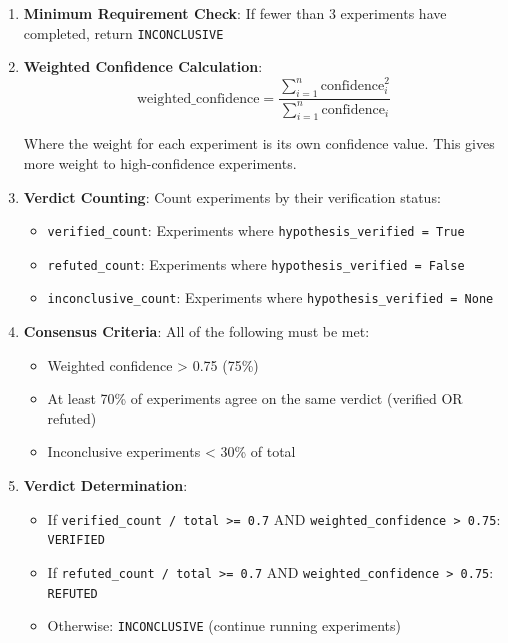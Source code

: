 \documentclass{book}
\begin{document}
\begin{enumerate}
    \item \textbf{Minimum Requirement Check}: If fewer than 3 experiments have completed, return \texttt{INCONCLUSIVE}

    \item \textbf{Weighted Confidence Calculation}:
    \begin{equation}
        \text{weighted\_confidence} = \frac{\sum_{i=1}^{n} \text{confidence}_i^2}{\sum_{i=1}^{n} \text{confidence}_i}
    \end{equation}

    Where the weight for each experiment is its own confidence value. This gives more weight to high-confidence experiments.

    \item \textbf{Verdict Counting}: Count experiments by their verification status:
    \begin{itemize}
        \item \texttt{verified\_count}: Experiments where \texttt{hypothesis\_verified = True}
        \item \texttt{refuted\_count}: Experiments where \texttt{hypothesis\_verified = False}
        \item \texttt{inconclusive\_count}: Experiments where \texttt{hypothesis\_verified = None}
    \end{itemize}

    \item \textbf{Consensus Criteria}: All of the following must be met:
    \begin{itemize}
        \item Weighted confidence > 0.75 (75\%)
        \item At least 70\% of experiments agree on the same verdict (verified OR refuted)
        \item Inconclusive experiments < 30\% of total
    \end{itemize}

    \item \textbf{Verdict Determination}:
    \begin{itemize}
        \item If \texttt{verified\_count / total >= 0.7} AND \texttt{weighted\_confidence > 0.75}: \texttt{VERIFIED}
        \item If \texttt{refuted\_count / total >= 0.7} AND \texttt{weighted\_confidence > 0.75}: \texttt{REFUTED}
        \item Otherwise: \texttt{INCONCLUSIVE} (continue running experiments)
    \end{itemize}
\end{enumerate}
\end{document}
